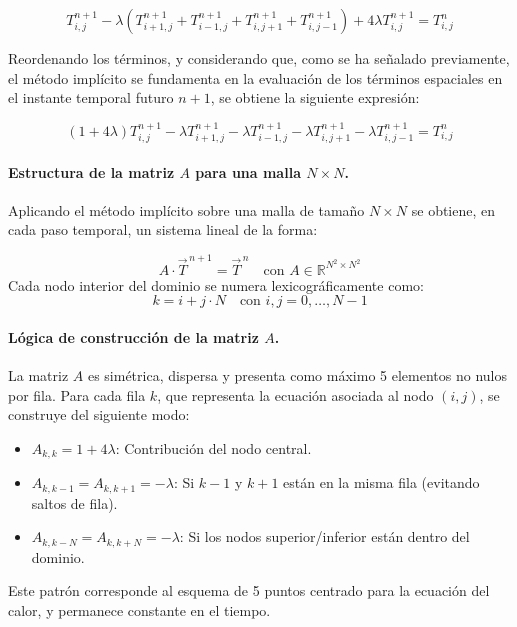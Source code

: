 \documentclass{article}
\begin{document}
$$
T_{i,j}^{n+1} - \lambda \left(
T_{i+1,j}^{n+1} + T_{i-1,j}^{n+1} + T_{i,j+1}^{n+1} + T_{i,j-1}^{n+1}
\right)
+ 4\lambda T_{i,j}^{n+1}
= T_{i,j}^{n}
$$

Reordenando los términos, y considerando que, como se ha señalado previamente, el método implícito se fundamenta en la evaluación de los términos espaciales en el instante temporal futuro $n+1$, se obtiene la siguiente expresión:

\begin{equation}
    \left(1 + 4\lambda \right) T_{i,j}^{n+1} 
    - \lambda T_{i+1,j}^{n+1}
    - \lambda T_{i-1,j}^{n+1}
    - \lambda T_{i,j+1}^{n+1}
    - \lambda T_{i,j-1}^{n+1}
    = T_{i,j}^{n}
\end{equation}

\paragraph{Estructura de la matriz $A$ para una malla $N \times N$.} Aplicando el método implícito sobre una malla de tamaño $N \times N$ se obtiene, en cada paso temporal, un sistema lineal de la forma:

\begin{equation}
    A \cdot \vec{T}^{\,n+1} = \vec{T}^{\,n}
    \quad \text{con } A \in \mathbb{R}^{N^2 \times N^2} 
\end{equation}
Cada nodo interior del dominio se numera lexicográficamente como:
$$
k = i + j \cdot N \quad \text{con } i, j = 0, \dots, N-1
$$

\paragraph{Lógica de construcción de la matriz $A$.} La matriz $A$ es simétrica, dispersa y presenta como máximo 5 elementos no nulos por fila. Para cada fila $k$, que representa la ecuación asociada al nodo $(i,j)$, se construye del siguiente modo:

\begin{itemize}
    \item $A_{k,k} = 1 + 4\lambda$: Contribución del nodo central.
    \item $A_{k,k-1} = A_{k,k+1} = -\lambda$: Si $k-1$ y $k+1$ están en la misma fila (evitando saltos de fila).
    \item $A_{k,k-N} = A_{k,k+N} = -\lambda$: Si los nodos superior/inferior están dentro del dominio.
\end{itemize}
Este patrón corresponde al esquema de 5 puntos centrado para la ecuación del calor, y permanece constante en el tiempo.
\end{document}
